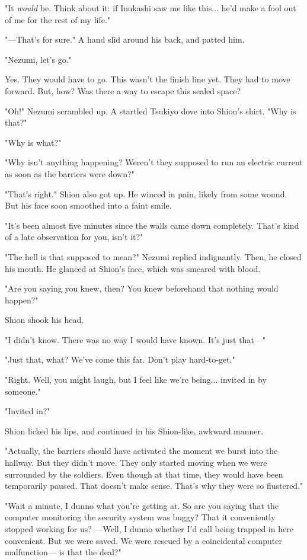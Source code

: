 "It \emph{would} be. Think about it: if Inukashi saw me like this... he'd make
a fool out of me for the rest of my life."

"---That's for sure." A hand slid around his back, and patted him.

"Nezumi, let's go."

Yes. They would have to go. This wasn't the finish line yet. They had to
move forward. But, how? Was there a way to escape this sealed space?

"Oh!" Nezumi scrambled up. A startled Tsukiyo dove into Shion's shirt.
"Why is that?"

"Why is what?"

"Why isn't anything happening? Weren't they supposed to run an electric
current as soon as the barriers were down?"

"That's right." Shion also got up. He winced in pain, likely from some
wound. But his face soon smoothed into a faint smile.

"It's been almost five minutes since the walls came down completely.
That's kind of a late observation for you, isn't it?"

"The hell is that supposed to mean?" Nezumi replied indignantly. Then,
he closed his mouth. He glanced at Shion's face, which was smeared with
blood.

"Are you saying you knew, then? You knew beforehand that nothing would
happen?"

Shion shook his head.

"I didn't know. There was no way I would have known. It's just that---"

"Just that, what? We've come this far. Don't play hard-to-get."

"Right. Well, you might laugh, but I feel like we're being... invited in
by someone."

"Invited in?"

Shion licked his lips, and continued in his Shion-like, awkward manner.

"Actually, the barriers should have activated the moment we burst into
the hallway. But they didn't move. They only started moving when we were
surrounded by the soldiers. Even though at that time, they would have
been temporarily paused. That doesn't make sense. That's why they were
so flustered."

"Wait a minute, I dunno what you're getting at. So are you saying that
the computer monitoring the security system was buggy? That it
conveniently stopped working for us? ---Well, I dunno whether I'd call
being trapped in here convenient. But we were saved. We were rescued by
a coincidental computer malfunction--- is that the deal?"

